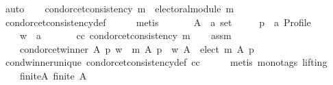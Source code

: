 \begin{isabellebody}
%
\isadelimproof
%
\endisadelimproof
%
\isatagproof
{}\isamarkupfalse%
\ {\isacharparenleft}{\kern0pt}auto{\isacharparenright}{\kern0pt}\isanewline
\ \ \isamarkupfalse%
\ {\isachardoublequoteopen}condorcet{\isacharunderscore}{\kern0pt}consistency\ m\ {\isasymLongrightarrow}\ electoral{\isacharunderscore}{\kern0pt}module\ m{\isachardoublequoteclose}\isanewline
\ \ \ \ \isamarkupfalse%
\ condorcet{\isacharunderscore}{\kern0pt}consistency{\isacharunderscore}{\kern0pt}def\isanewline
\ \ \ \ \isamarkupfalse%
\ metis\isanewline
{}\isamarkupfalse%
\isanewline
\ \ \isamarkupfalse%
\isanewline
\ \ \ \ A\ {\isacharcolon}{\kern0pt}{\isacharcolon}{\kern0pt}\ {\isachardoublequoteopen}{\isacharprime}{\kern0pt}a\ set{\isachardoublequoteclose}\ \isanewline
\ \ \ \ p\ {\isacharcolon}{\kern0pt}{\isacharcolon}{\kern0pt}\ {\isachardoublequoteopen}{\isacharprime}{\kern0pt}a\ Profile{\isachardoublequoteclose}\ \isanewline
\ \ \ \ w\ {\isacharcolon}{\kern0pt}{\isacharcolon}{\kern0pt}\ {\isachardoublequoteopen}{\isacharprime}{\kern0pt}a{\isachardoublequoteclose}\isanewline
\ \ \isamarkupfalse%
\isanewline
\ \ \ \ cc{\isacharcolon}{\kern0pt}\ {\isachardoublequoteopen}condorcet{\isacharunderscore}{\kern0pt}consistency\ m{\isachardoublequoteclose}\isanewline
\ \ \isamarkupfalse%
\ assm{}{\isacharcolon}{\kern0pt}\isanewline
\ \ \ \ {\isachardoublequoteopen}condorcet{\isacharunderscore}{\kern0pt}winner\ A\ p\ w\ {\isasymLongrightarrow}\ m\ A\ p\ {\isacharequal}{\kern0pt}\ {\isacharparenleft}{\kern0pt}{\isacharbraceleft}{\kern0pt}w{\isacharbraceright}{\kern0pt}{\isacharcomma}{\kern0pt}\ A\ {\isacharminus}{\kern0pt}\ elect\ m\ A\ p{\isacharcomma}{\kern0pt}\ {\isacharbraceleft}{\kern0pt}{\isacharbraceright}{\kern0pt}{\isacharparenright}{\kern0pt}{\isachardoublequoteclose}\isanewline
\ \ \ \ \isamarkupfalse%
\ cond{\isacharunderscore}{\kern0pt}winner{\isacharunderscore}{\kern0pt}unique{}\ condorcet{\isacharunderscore}{\kern0pt}consistency{\isacharunderscore}{\kern0pt}def\ cc\isanewline
\ \ \ \ \isamarkupfalse%
\ {\isacharparenleft}{\kern0pt}metis\ {\isacharparenleft}{\kern0pt}mono{\isacharunderscore}{\kern0pt}tags{\isacharcomma}{\kern0pt}\ lifting{\isacharparenright}{\kern0pt}{\isacharparenright}{\kern0pt}\isanewline
\ \ \isamarkupfalse%
\isanewline
\ \ \ \ finite{\isacharunderscore}{\kern0pt}A{\isacharcolon}{\kern0pt}\ {\isachardoublequoteopen}finite\ A{\isachardoublequoteclose}\ \isanewline

\end{isabellebody}
